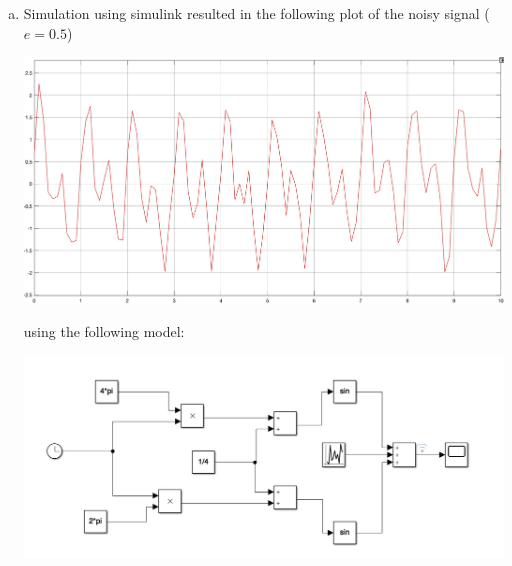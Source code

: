 \documentclass[12pt]{article}
\begin{document}
\begin{enumerate}[a)]


	\item Simulation using simulink resulted in the following plot of the noisy signal ($e=0.5$)\\
        \begin{centering}
        \includegraphics[scale = 0.14]{figures/noise_sim}\\
        \end{centering}

        using the following model:\\
        \begin{centering}
        \includegraphics[scale = 0.3]{figures/simulink_1bc}\\
        \end{centering}


\end{enumerate}
\end{document}
